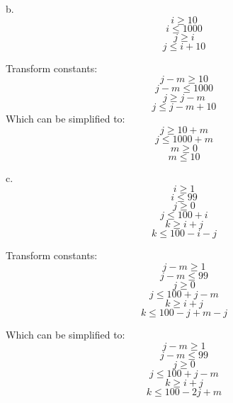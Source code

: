 \documentclass[11pt]{article}
\begin{document}
\begin{enumerate}
\begin{Answer}
		b.
		$$i \ge 10$$
		$$i \le 1000$$
		$$j \ge i$$
		$$j \le i + 10$$
		
		Transform constants:
		$$j - m \ge 10$$
		$$j - m \le 1000$$
		$$j \ge j - m$$
		$$j \le j - m + 10$$
		Which can be simplified to:
		$$j \ge 10 + m$$
		$$j \le 1000 + m$$
		$$m \ge 0$$
		$$m \le 10$$
		
		c.
		$$i \ge 1$$
		$$i \le 99$$
		$$j \ge 0$$
		$$j \le 100 + i$$
		$$k \ge i + j$$
		$$k \le 100 - i - j$$
		
		Transform constants:
		$$j - m \ge 1$$
		$$j - m \le 99$$
		$$j \ge 0$$
		$$j \le 100 + j - m$$
		$$k \ge i + j$$
		$$k \le 100 - j + m - j$$
		
		Which can be simplified to:
		$$j - m \ge 1$$
		$$j - m \le 99$$
		$$j \ge 0$$
		$$j \le 100 + j - m$$
		$$k \ge i + j$$
		$$k \le 100 - 2j + m$$
		\end{Answer}
\end{enumerate}
\end{document}
